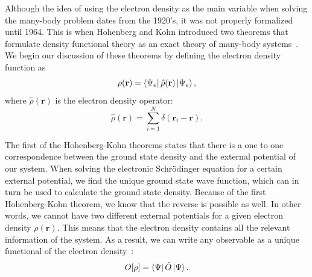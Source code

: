 \begin{refsection}
Although the idea of using the electron density as the main variable when solving the many-body problem dates from the 1920's, it was not properly formalized until 1964. This is when Hohenberg and Kohn introduced two theorems that formulate density functional theory as an exact theory of many-body systems~\cite{Hohenberg1964}. We begin our discussion of these theorems by defining the electron density function as
\begin{equation}
\rho(\mathbf{r}) = \bra{\Psi_e} \hat{\rho} (\mathbf{r}) \ket{\Psi_e},
\end{equation}
where $\hat{\rho} (\mathbf{r})$ is the electron density operator:
\begin{equation}
\hat{\rho} (\mathbf{r}) = \sum_{i=1}^{N} \delta (\mathbf{r}_i - \mathbf{r}).
\end{equation}

The first of the Hohenberg-Kohn theorems states that there is a one to one correspondence between the ground state density and the external potential of our system. When solving the electronic Schr\"odinger equation for a certain external potential, we find the unique ground state wave function, which can in turn be used to calculate the ground state density. Because of the first Hohenberg-Kohn theorem, we know that the reverse is possible as well. In other words, we cannot have two different external potentials for a given electron density $\rho(\mathbf{r})$. This means that the electron density contains all the relevant information of the system. As a result, we can write any observable as a unique functional of the electron density~\cite{Cottenier2004}:
\begin{equation}
O[\rho] = \bra{\Psi} \hat{O} \ket{\Psi}.
\end{equation}


\end{refsection}
